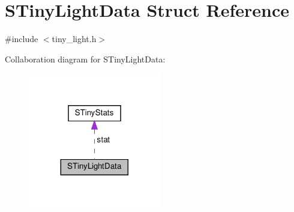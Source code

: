 \hypertarget{structSTinyLightData}{}\section{S\+Tiny\+Light\+Data Struct Reference}
\label{structSTinyLightData}


{\ttfamily \#include $<$tiny\+\_\+light.\+h$>$}



Collaboration diagram for S\+Tiny\+Light\+Data\+:\nopagebreak
\begin{figure}[H]
\begin{center}
\leavevmode
\includegraphics[width=164pt]{structSTinyLightData__coll__graph}
\end{center}
\end{figure}
